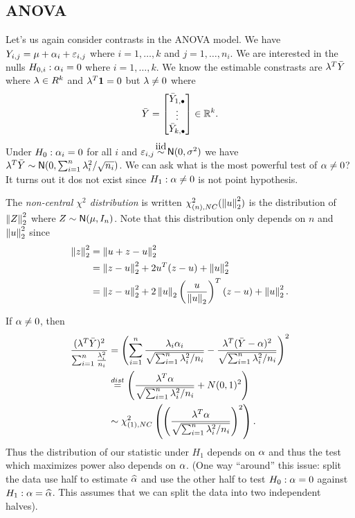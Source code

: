 \subsection{ANOVA}
Let's us again consider contrasts in the ANOVA model. We have $Y_{i,j} = \mu + {\alpha}_i + \varepsilon_{i,j}$ where $i=1,\ldots, k$ and $j=1,\ldots, n_i$. We are interested in the nulls $H_{0,i} : {\alpha}_i =0$ where $i=1,\ldots, k$. We know the estimable constrasts are $\lambda^T \bar{Y}$ where $\lambda \in R^k$ and $\lambda^T {{\bf 1}} = 0$ but $\lambda \neq 0$ where 
\[\bar{Y} = \begin{bmatrix}
    \bar{Y}_{1,\bullet} \\ \vdots \\ \bar{Y}_{k,\bullet}
\end{bmatrix} \in {\mathbb R}^k. \]
Under $H_0 : {\alpha}_i = 0$ for all $i$ and $\eps_{i,j} \iid \Na(0,\sigma^2)$ we have $\lambda^T \bar{Y} \sim {\mathsf{N}}(0, \sum_{i=1}^n \lambda_i^2/\sqrt{n_i})$. We can ask what is the most powerful test of ${\alpha} \neq 0$? It turns out it dos not exist since $H_1 : {\alpha} \neq 0$ is not  point hypothesis.
\begin{defn}
    The \emph{non-central $\chi^2$ distribution} is written $\chi_{(n),NC}^2(\left\|u\right\|_2^2)$ is the distribution of $\left\|Z\right\|_2^2$ where $Z \sim {\mathsf{N}}(\mu,I_n)$. Note that this distribution only depends on $n$ and $\left\|u\right\|_2^2$ since 
    \begin{align*}
        \left\|z\right\|_2^2&= \left\|u+z-u\right\|_2^2\\
        &= \left\|z-u\right\|_2^2 +2u^T(z-u) +\left\|u\right\|_2^2\\
        &= \left\|z-u\right\|_2^2 +2\left\|u\right\|_2\left(\frac{u}{\left\|u\right\|_2}\right)^T(z-u) +\left\|u\right\|_2^2.
    \end{align*}
\end{defn}
If ${\alpha} \neq 0$, then 
\begin{align*}
    \frac{(\lambda^T \bar{Y})^2}{\sum_{i=1}^n \frac{\lambda_i^2}{n_i}}&=\left(\sum_{i=1}^n \frac{\lambda_i {\alpha}_i}{\sqrt{\sum_{i=1}^n \lambda_i^2/n_i}}-\frac{\lambda^T(\bar{Y}-{\alpha})^2}{\sqrt{\sum_{i=1}^n \lambda_i^2/n_i}}\right)^2 \\
    &\stackrel{dist}{=} \left(\frac{\lambda^T{\alpha}}{\sqrt{\sum_{i=1}^n \lambda_i^2/n_i}}+N(0,1)^2\right)\\
    &\sim \chi^2_{(1), NC}\left(\left(\frac{\lambda^T{\alpha}}{\sqrt{\sum_{i=1}^n \lambda_i^2/n_i}}\right)^2\right).
\end{align*}
Thus the distribution of our statistic under $H_1$ depends on ${\alpha}$ and thus the test which maximizes power also depends on ${\alpha}$. (One way ``around'' this issue: split the data use half to estimate $\widehat{{\alpha}}$ and use the other half to test $H_0 : {\alpha}=0$ against $H_1 : {\alpha} = \widehat{{\alpha}}$. This assumes that we can split the data into two independent halves).
